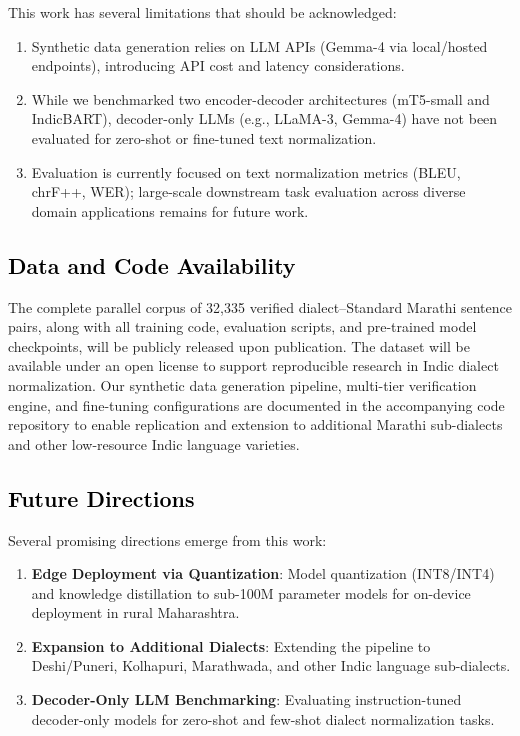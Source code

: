 This work has several limitations that should be acknowledged:
\begin{enumerate}
    \item Synthetic data generation relies on LLM APIs (Gemma-4 via local/hosted endpoints), introducing API cost and latency considerations.
    \item While we benchmarked two encoder-decoder architectures (mT5-small and IndicBART), decoder-only LLMs (e.g., LLaMA-3, Gemma-4) have not been evaluated for zero-shot or fine-tuned text normalization.
    \item Evaluation is currently focused on text normalization metrics (BLEU, chrF++, WER); large-scale downstream task evaluation across diverse domain applications remains for future work.
\end{enumerate}


\subsection{\textcolor{black}{Data and Code Availability}}

The complete parallel corpus of 32,335 verified dialect--Standard Marathi sentence pairs, along with all training code, evaluation scripts, and pre-trained model checkpoints, will be publicly released upon publication.
The dataset will be available under an open license to support reproducible research in Indic dialect normalization.
Our synthetic data generation pipeline, multi-tier verification engine, and fine-tuning configurations are documented in the accompanying code repository to enable replication and extension to additional Marathi sub-dialects and other low-resource Indic language varieties.

\subsection{\textcolor{black}{Future Directions}}

Several promising directions emerge from this work:
\begin{enumerate}
    \item \textbf{Edge Deployment via Quantization}: Model quantization (INT8/INT4) and knowledge distillation to sub-100M parameter models for on-device deployment in rural Maharashtra.
    \item \textbf{Expansion to Additional Dialects}: Extending the pipeline to Deshi/Puneri, Kolhapuri, Marathwada, and other Indic language sub-dialects.
    \item \textbf{Decoder-Only LLM Benchmarking}: Evaluating instruction-tuned decoder-only models for zero-shot and few-shot dialect normalization tasks.
\end{enumerate}


